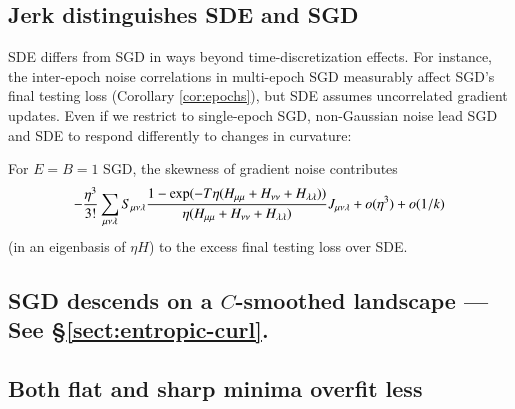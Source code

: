         \subsection{Jerk distinguishes SDE and SGD}
            SDE differs from SGD in ways beyond time-discretization effects.
            For instance, the inter-epoch noise correlations in multi-epoch SGD
            measurably affect SGD's final testing loss (Corollary
            \ref{cor:epochs}), but SDE assumes uncorrelated gradient updates.
            Even if we restrict to single-epoch SGD, 
            non-Gaussian noise lead SGD and SDE to respond differently to
            changes in curvature: 
            \begin{cor}[$\sdia{c(012-3)(03-13-23)}$] \label{cor:vsode}
                For $E=B=1$ SGD, the skewness of gradient noise contributes  
                \begin{align*}
                    -\frac{\eta^3}{3!}
                    \sum_{\mu\nu\lambda}
                        S_{\mu\nu\lambda}
                        \frac{
                            1 - \exp(-T\eta (H_{\mu\mu} + H_{\nu\nu} + H_{\lambda\lambda}))
                        }{
                            \eta (H_{\mu\mu} + H_{\nu\nu} + H_{\lambda\lambda})
                        }
                        J_{\mu\nu\lambda}
                        + o(\eta^3)
                        + o(1/k)
                        \squash
                \end{align*}
                (in an
                eigenbasis of $\eta H$)
                to the excess final testing loss over SDE.
            \end{cor}


       
        \subsection{SGD descends on a $C$-smoothed landscape {\rm --- See \S\ref{sect:entropic-curl}.}}
        \subsection{Both flat and sharp minima overfit less}
            \label{subsect:curvature-and-overfitting}%

